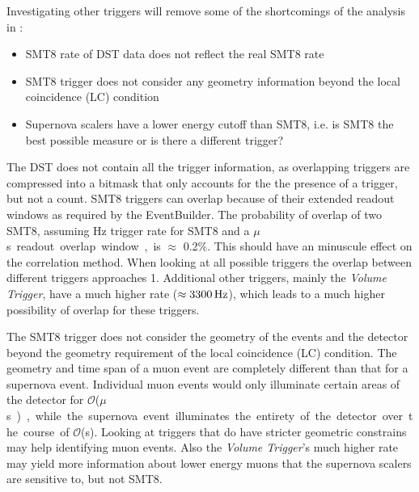 Investigating other triggers will remove some of the shortcomings of the analysis in \cite{vbaumaster}:

\begin{itemize}
  \item SMT8 rate of DST data does not reflect the real SMT8 rate
  \item SMT8 trigger does not consider any geometry information beyond the local coincidence (LC) condition
  \item Supernova scalers have a lower energy cutoff than SMT8, i.e. is SMT8 the best possible measure or is there a different trigger?
\end{itemize}

The DST does not contain all the trigger information, as overlapping triggers are compressed into a bitmask that only accounts for the the presence of a trigger, but not a count. SMT8 triggers can overlap because of their extended readout windows as required by the EventBuilder. The probability of overlap of two SMT8, assuming \unit[2100]{Hz} trigger rate for SMT8 and a \unit[10]{$\mu$s} readout overlap window, is $\approx$ 0.2\%. This should have an minuscule effect on the correlation method. When looking at all possible triggers the overlap between different triggers approaches 1. Additional other triggers, mainly the \emph{Volume Trigger}, have a much higher rate ($\approx \unit[3300]{Hz}$), which leads to a much higher possibility of overlap for these triggers. 

The SMT8 trigger does not consider the geometry of the events and the detector beyond the geometry requirement of the local coincidence (LC) condition. The geometry and time span of a muon event are completely different than that for a supernova event. Individual muon events would only illuminate certain areas of the detector for $\mathcal{O}$(\unit[1 - 10]{$\mu$s}), while the supernova event illuminates the entirety of the detector over the course of $\mathcal{O}$(\unit[1 - 10]{s}). Looking at triggers that do have stricter geometric constrains may help identifying muon events. Also the \emph{Volume Trigger}'s much higher rate may yield more information about lower energy muons that the supernova scalers are sensitive to, but not SMT8. 


